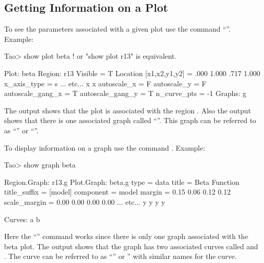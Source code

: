 \documentclass{hitec}
\begin{document}
\newpage

\subsection{Getting Information on a Plot}

To see the parameters associated with a given plot use the command ``''.
Example:

\begin{code}
Tao> show plot beta  ! or "show plot r13" is equivalent.

Plot:  beta
Region:  r13
Visible                = T
Location [x1,x2,y1,y2] = .000  1.000  .717  1.000
x_axis_type          = s
... etc...
x%
x%
autoscale_x          = F
autoscale_y          = F
autoscale_gang_x     = T
autoscale_gang_y     = T
n_curve_pts          = -1
Graphs:
   g
\end{code}
The output shows that the  plot is associated with the region . Also the
output shows that there is one associated graph called ``''. This graph can be referred
to as ``'' or ``''.

To display information on a graph use the command . Example:
\begin{code}
Tao> show graph beta

Region.Graph: r13.g
Plot.Graph:   beta.g
type                             = data
title                            = Beta Function
title_suffix                     = [model]
component                        = model
margin                           =   0.15    0.06    0.12    0.12  %
scale_margin                     =   0.00    0.00    0.00    0.00  %
... etc...
y%
y%
y%
y%

Curves:
   a
   b
\end{code}
Here the ``'' command works since there is only one graph associated with the
beta plot. The output shows that the graph has two associated curves called  and .
The  curve can be referred to as ``'' or '' with similar names for
the  curve.
\end{document}
